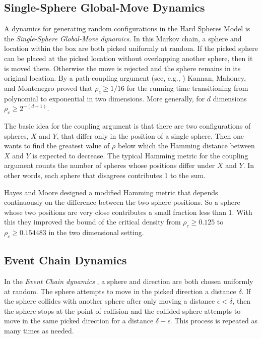 \documentclass[a4paper,11pt]{article}
\begin{document}
\subsection*{Single-Sphere Global-Move Dynamics}

A dynamics for generating random configurations in the Hard Spheres Model is the \textit{Single-Sphere Global-Move dynamics}.  In this Markov chain, a sphere and location within the box are both picked uniformly at random.  If the picked sphere can be placed at the picked location without overlapping another sphere, then it is moved there.  Otherwise the move is rejected and the sphere remains in its original location.  By a path-coupling argument (see, e.g., \cite{Bubley}) Kannan, Mahoney, and Montenegro \cite{Kannan} proved that $\rho_c \ge 1/16$ for the running time transitioning from polynomial to exponential in two dimensions.  More generally, for $d$ dimensions $\rho_c \ge 2^{-(d + 1)}$.

The basic idea for the coupling argument is that there are two configurations of spheres, $X$ and $Y$, that differ only in the position of a single sphere.  Then one wants to find the greatest value of $\rho$ below which the Hamming distance between $X$ and $Y$ is expected to decrease.  The typical Hamming metric for the coupling argument counts the number of spheres whose positions differ under $X$ and $Y$.  In other words, each sphere that disagrees contributes 1 to the sum.

Hayes and Moore \cite{Hayes} designed a modified Hamming metric that depends continuously on the difference between the two sphere positions.  So a sphere whose two positions are very close contributes a small fraction less than 1.  With this they improved the bound of the critical density from $\rho_c \ge 0.125$ to $\rho_c \ge 0.154483$ in the two dimensional setting.

\subsection*{Event Chain Dynamics}

In the \textit{Event Chain dynamics} \cite{Bernard}, a sphere and direction are both chosen uniformly at random.  The sphere attempts to move in the picked direction a distance $\delta$.  If the sphere collides with another sphere after only moving a distance $\epsilon < \delta$, then the sphere stops at the point of collision and the collided sphere attempts to move in the same picked direction for a distance $\delta - \epsilon$.  This process is repeated as many times as needed.
\end{document}
